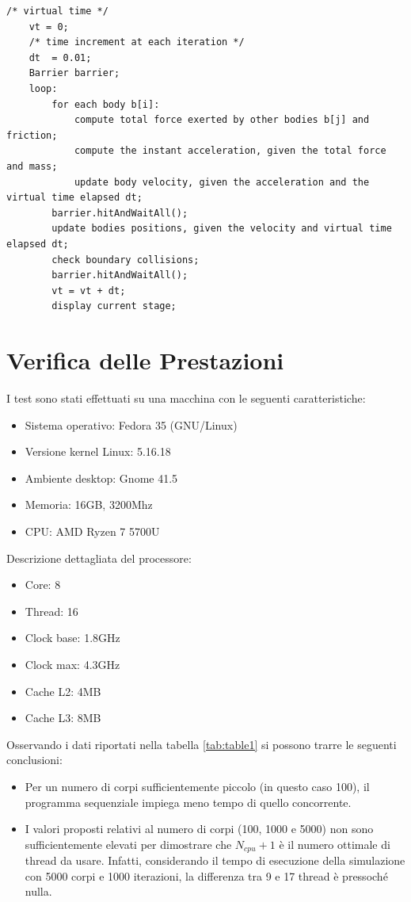 \documentclass[12pt,a4paper,openright,twoside]{book}
\begin{document}
\begin{lstlisting}[label=lst:lst2,caption=pseudocodice del programma parallelo]
	/* virtual time */
	vt = 0;
	/* time increment at each iteration */     
	dt  = 0.01;
	Barrier barrier;
	loop:
		for each body b[i]:
			compute total force exerted by other bodies b[j] and friction;
			compute the instant acceleration, given the total force and mass;
			update body velocity, given the acceleration and the virtual time elapsed dt;
		barrier.hitAndWaitAll();
		update bodies positions, given the velocity and virtual time elapsed dt;
		check boundary collisions;
		barrier.hitAndWaitAll();
		vt = vt + dt;   
		display current stage;
\end{lstlisting}
\chapter{Verifica delle Prestazioni} %
\label{chap:Verifica delle Prestazioni}

I test sono stati effettuati su una macchina con le seguenti caratteristiche:
\begin{itemize}
	\item Sistema operativo: Fedora 35 (GNU/Linux)
	\item Versione kernel Linux: 5.16.18
	\item Ambiente desktop: Gnome 41.5
	\item Memoria: 16GB, 3200Mhz
	\item CPU: AMD Ryzen 7 5700U
\end{itemize}
Descrizione dettagliata del processore:
\begin{itemize}
	\item Core: 8
	\item Thread: 16
	\item Clock base: 1.8GHz
	\item Clock max: 4.3GHz
	\item Cache L2: 4MB
	\item Cache L3: 8MB
\end{itemize}

Osservando i dati riportati nella tabella \ref{tab:table1}
si possono trarre le seguenti conclusioni:
\begin{itemize}
	\item Per un numero di corpi sufficientemente piccolo (in questo caso 100),
	il programma sequenziale impiega meno tempo di quello concorrente.
	\item I valori proposti relativi al numero di corpi (100, 1000 e 5000) non sono sufficientemente elevati per
	dimostrare che $N_{cpu}+1$ è il numero ottimale di thread da usare. Infatti, considerando il tempo di esecuzione
	della simulazione con 5000 corpi e 1000 iterazioni, la differenza tra 9 e 17 thread è pressoché nulla.
\end{itemize}
\end{document}
